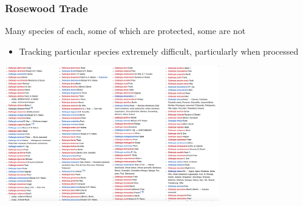 \documentclass[10pt]{beamer}
\begin{document}
\begin{frame}[t]
\frametitle{Rosewood Trade}
\vspace{0.25cm}

	Many species of each, some of which are protected, some are not\\
		\begin{itemize}
			\item Tracking particular species extremely difficult, particularly when processed
		\end{itemize}
		
	\vspace{0.25cm}

	\begin{center}
		\includegraphics[width=0.7\textwidth]{figures/Dspecies.png}
	\end{center}
\end{frame}
\end{document}
